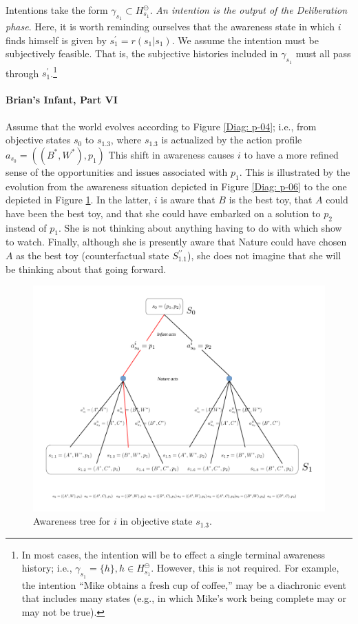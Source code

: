 \documentclass[
11pt,
titlepage,
reqno,
]{article}%
\theoremstyle{definition}
\begin{document}
Intentions take the form $\gamma_{s_1}\subset H^\ominus_{s_1}$.
\textit{An intention is the output of the Deliberation phase}.
Here, it is worth reminding ourselves that the awareness state in which $i$ finds himself is given by $s^\prime_1=r(s_1|s_1)$.
We assume the intention must be subjectively feasible.
That is, the subjective histories included in $\gamma_{s_1}$ must all pass through $s^\prime_1$.\footnote
{
	In most cases, the intention will be to effect a single terminal awareness history; i.e., $\gamma_{s_1}=\{h\}, h\in H^\ominus_{s_1}$. 
	However, this is not required. 
	For example, the intention ``Mike obtains a fresh cup of coffee,'' may be a diachronic event that includes many states (e.g., in which Mike's work being complete may or may not be true).
}
 

\paragraph{Brian's Infant, Part VI}
Assume that the world evolves according to Figure \ref{Diag: p-04}; i.e., from objective states $s_0$ to $s_{1.3}$, where $s_{1.3}$ is actualized by the action profile $a_{s_0}=((B^\ast,W^\ast),p_1)$
This shift in awareness causes $i$ to have a more refined sense of the opportunities and issues associated with $p_1$.
This is illustrated by the evolution from the awareness situation depicted in Figure \ref{Diag: p-06} to the one depicted in Figure \ref{Diag: p-07}. 
In the latter, $i$ is aware that $B$ is the best toy, that $A$ could have been the best toy, and that she could have embarked on a solution to $p_2$ instead of $p_1$. 
She is not thinking about anything having to do with which show to watch.
Finally, although she is presently aware that Nature could have chosen $A$ as the best toy (counterfactual state $S^{\prime\prime}_{1.1}$),
she does not imagine that she will be thinking about that going forward.

\begin{figure}[h!]
	\centering
	\includegraphics*[page=7,trim = 0in 0in 1in 0in,scale=.7]{Awareness_Diagrams_All}
	\caption{Awareness tree for $i$ in objective state $s_{1.3}$.\label{Diag: p-07}}%
\end{figure}
\end{document}
